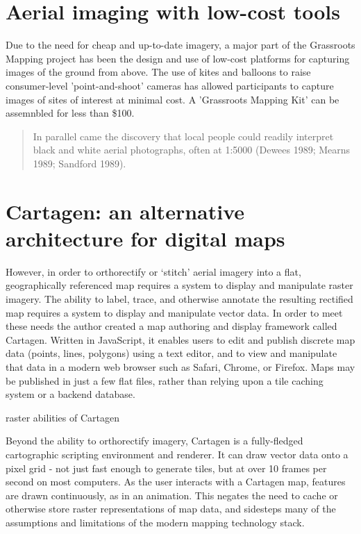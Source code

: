 \documentclass[11pt]{report}
\begin{document}
\section{Aerial imaging with low-cost tools}

Due to the need for cheap and up-to-date imagery, a major part of the Grassroots Mapping project has been the design and use of low-cost platforms for capturing images of the ground from above. The use of kites and balloons to raise consumer-level 'point-and-shoot' cameras has allowed participants to capture images of sites of interest at minimal cost. A 'Grassroots Mapping Kit' can be assemnbled for less than \$100. 

\begin{quote}
In parallel came the discovery that local people could readily interpret black and white aerial photographs, often at 1:5000 (Dewees 1989; Mearns 1989; Sandford 1989). 
\cite{chambers2006participatory}
\end{quote}

\section{Cartagen: an alternative architecture for digital maps}

However, in order to orthorectify or `stitch' aerial imagery into a flat, geographically referenced map requires a system to display and manipulate raster imagery. The ability to label, trace, and otherwise annotate the resulting rectified map requires a system to display and manipulate vector data. In order to meet these needs the author created a map authoring and display framework called Cartagen. Written in JavaScript, it enables users to edit and publish discrete map data (points, lines, polygons) using a text editor, and to view and manipulate that data in a modern web browser such as Safari, Chrome, or Firefox. Maps may be published in just a few flat files, rather than relying upon a tile caching system or a backend database.

raster abilities of Cartagen

Beyond the ability to orthorectify imagery, Cartagen is a fully-fledged cartographic scripting environment and renderer. It can draw vector data onto a pixel grid - not just fast enough to generate tiles, but at over 10 frames per second on most computers. As the user interacts with a Cartagen map, features are drawn continuously, as in an animation. This negates the need to cache or otherwise store raster representations of map data, and sidesteps many of the assumptions and limitations of the modern mapping technology stack.
\end{document}
